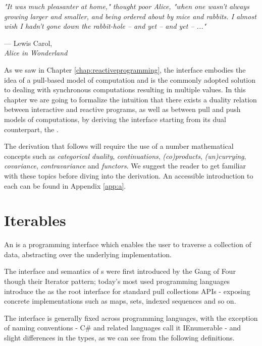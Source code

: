 \let\textcircled=\pgftextcircled
{}

\epigraph{\hspace{4ex}\textit{"It was much pleasanter at home," thought poor Alice, "when one wasn't always growing larger and smaller, and being ordered about by mice and rabbits. I almost wish I hadn't gone down the rabbit-hole -- and yet -- and yet -- ..."}}{--- Lewis Carol,\\ \textit{Alice in Wonderland}}

As we saw in Chapter \ref{chap:reactiveprogramming}, the  interface embodies the idea of a pull-based model of computation and is the commonly adopted solution to dealing with synchronous computations resulting in multiple values. In this chapter we are going to formalize the intuition that there exists a duality relation between interactive and reactive programs, as well as between pull and push models of computations, by deriving the  interface starting from its dual counterpart, the .

The derivation that follows will require the use of a number mathematical concepts such as \textit{categorical duality}, \textit{continuations}, \textit{(co)products}, \textit{(un)currying}, \textit{covariance}, \textit{contravariance} and \textit{functors}. We suggest the reader to get familiar with these topics before diving into the derivation. An accessible introduction to each can be found in Appendix \ref{app:a}.

\section{Iterables}
\label{sec:iterables}

An  is a programming interface which enables the user to traverse a collection of data, abstracting over the underlying implementation\cite{gamma1995design}.

The interface and semantics of s were first introduced by the Gang of Four though their Iterator pattern\cite{gamma1995design}; today's most used programming languages introduce the  as the root interface for standard pull collections APIs - exposing concrete implementations such as maps, sets, indexed sequences and so on. 

The  interface is generally fixed across programming languages, with the exception of naming conventions - C\# and related languages call it IEnumerable - and slight differences in the types, as we can see from the following definitions.\\

